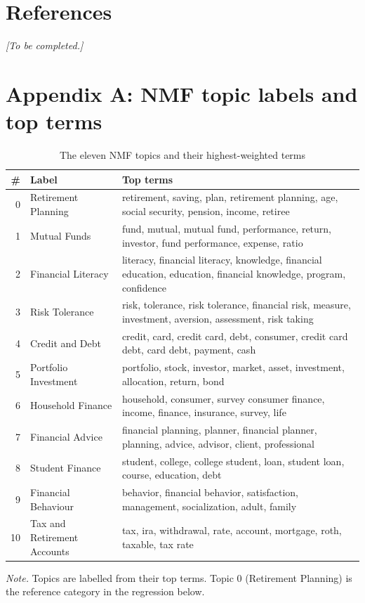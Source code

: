 \documentclass[11pt,a4paper]{article}
\newcommand{\tablenote}[1]{\par\smallskip\parbox{\linewidth}{\footnotesize\textit{Note.} #1}}
\begin{document}
\section{References}\label{references}

\textit{[To be completed.]}

\appendix
\section{Appendix A: NMF topic labels and top terms}\label{app:topics}

\begin{table}[htbp]
\centering
\small
\caption{The eleven NMF topics and their highest-weighted terms}
\label{tab:appendix_topics}
\begin{tabular}{rll}
\toprule
\# & Label & Top terms \\
\midrule
0 & Retirement Planning & retirement, saving, plan, retirement planning, age, social security, pension, income, retiree \\
1 & Mutual Funds & fund, mutual, mutual fund, performance, return, investor, fund performance, expense, ratio \\
2 & Financial Literacy & literacy, financial literacy, knowledge, financial education, education, financial knowledge, program, confidence \\
3 & Risk Tolerance & risk, tolerance, risk tolerance, financial risk, measure, investment, aversion, assessment, risk taking \\
4 & Credit and Debt & credit, card, credit card, debt, consumer, credit card debt, card debt, payment, cash \\
5 & Portfolio Investment & portfolio, stock, investor, market, asset, investment, allocation, return, bond \\
6 & Household Finance & household, consumer, survey consumer finance, income, finance, insurance, survey, life \\
7 & Financial Advice & financial planning, planner, financial planner, planning, advice, advisor, client, professional \\
8 & Student Finance & student, college, college student, loan, student loan, course, education, debt \\
9 & Financial Behaviour & behavior, financial behavior, satisfaction, management, socialization, adult, family \\
10 & Tax and Retirement Accounts & tax, ira, withdrawal, rate, account, mortgage, roth, taxable, tax rate \\
\bottomrule
\end{tabular}
\tablenote{Topics are labelled from their top terms. Topic 0 (Retirement Planning) is the reference category in the regression below.}
\end{table}
\end{document}
